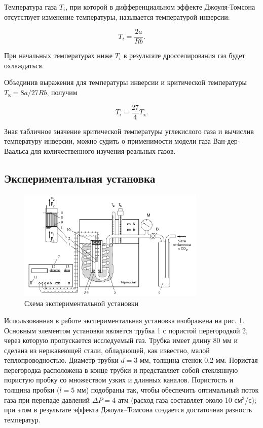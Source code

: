 \documentclass[a4paper,12pt]{article} %
\begin{document}
Температура газа $T_i$, при которой в дифференциальном эффекте Джоуля-Томсона отсутствует изменение температуры, называется температурой инверсии:

\begin{equation}
    T_i = \frac{2a}{Rb}.
\end{equation}

При начальных температурах ниже $T_i$ в результате дросселирования газ будет охлаждаться.

Объединив выражения для температуры инверсии и критической температуры $T_\text{к} = 8a/27Rb$, получим

\begin{equation}
    T_i = \frac{27}{4}T_\text{к}.
\end{equation}

Зная табличное значение критической температуры углекислого газа и вычислив температуру инверсии, можно судить о применимости модели газа Ван-дер-Ваальса для количественного изучения реальных газов.

\subsection{Экспериментальная установка}

\begin{figure}
    \centering
    \includegraphics[width = 0.8\textwidth]{setup.PNG}
    \caption{Схема экспериментальной установки}
    \label{fig:setup}
\end{figure}

Использованная в работе экспериментальная установка изображена на рис. \ref{fig:setup}. Основным элементом
установки является трубка 1 с пористой перегородкой 2, через которую пропускается исследуемый газ. Трубка имеет длину 80 мм и сделана из нержавеющей стали, обладающей, как известно, малой теплопроводностью. Диаметр трубки $d = 3$ мм,
толщина стенок 0,2 мм. Пористая перегородка расположена в конце трубки и представляет собой стеклянную пористую пробку со множеством узких и длинных каналов. Пористость и толщина пробки ($l = 5$ мм) подобраны так, чтобы обеспечить оптимальный поток газа при перепаде давлений $ \Delta P = 4$ атм (расход газа составляет около 10 см$^3$/с); при этом в результате эффекта Джоуля–Томсона создается достаточная разность температур.
\end{document}
